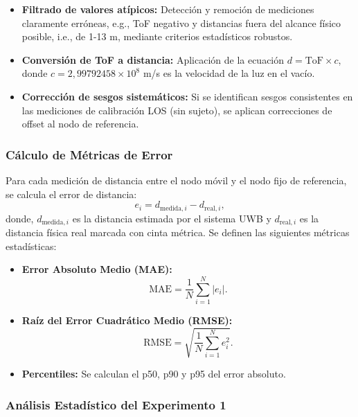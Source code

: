 \begin{itemize}
\item \textbf{Filtrado de valores atípicos:} Detección y remoción de mediciones claramente erróneas, e.g.,  ToF negativo y distancias fuera del alcance físico posible, i.e., de 1-13 m, mediante criterios estadísticos robustos.

\item \textbf{Conversión de ToF a distancia:} Aplicación de la ecuación $d = \text{ToF} \times c$, donde $c = 2,99792458\times 10^{8}$ m/s es la velocidad de la luz en el vacío.

\item \textbf{Corrección de sesgos sistemáticos:} Si se identifican sesgos consistentes en las mediciones de calibración LOS (sin sujeto), se aplican correcciones de offset al nodo de referencia.
\end{itemize}

\subsubsection{Cálculo de Métricas de Error}

Para cada medición de distancia entre el nodo móvil y el nodo fijo de referencia, se calcula el error de distancia:
%
\begin{equation}
e_i = d_{\text{medida},i} - d_{\text{real},i},
\end{equation}
%
donde, $d_{\text{medida},i}$ es la distancia estimada por el sistema UWB y $d_{\text{real},i}$ es la distancia física real marcada con cinta métrica. Se definen las siguientes métricas estadísticas:
%
\begin{itemize}
\item \textbf{Error Absoluto Medio (MAE):} 
%
\begin{equation}
    \textrm{MAE} = \frac{1}{N} \sum_{i=1}^{N} |e_i|.
\end{equation}

\item \textbf{Raíz del Error Cuadrático Medio (RMSE):}
%
\begin{equation}
    \textrm{RMSE} = \sqrt{\frac{1}{N} \sum_{i=1}^{N} e_i^2}.
\end{equation}
%
\item \textbf{Percentiles:} Se calculan el p50, p90 y p95 del error absoluto.
\end{itemize}

\subsubsection{Análisis Estadístico del Experimento 1}

